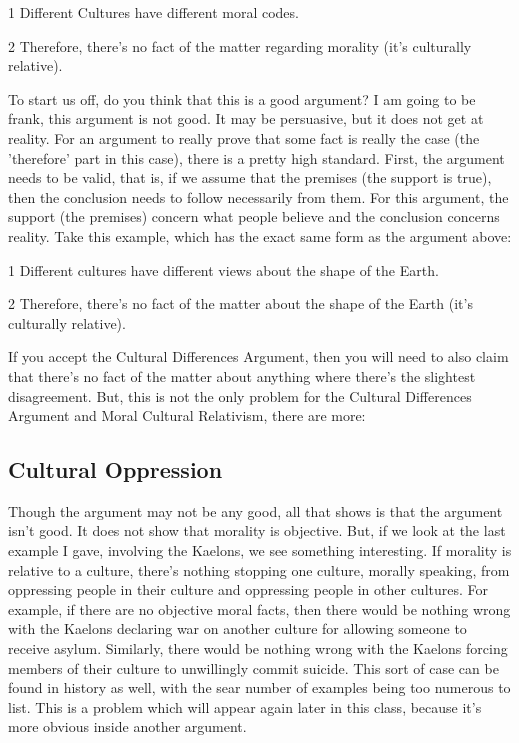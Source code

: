 \begin{earg}
\item[1] Different Cultures have different moral codes.
\item[2] Therefore, there's no fact of the matter regarding morality (it's culturally relative).
\end{earg}

To start us off, do you think that this is a good argument? I am going to be frank, this argument is not good. It may be persuasive, but it does not get at reality. For an argument to really prove that some fact is really the case (the 'therefore' part in this case), there is a pretty high standard. First, the argument needs to be valid, that is, if we assume that the premises (the support is true), then the conclusion needs to follow necessarily from them. For this argument, the support (the premises) concern what people believe and the conclusion concerns reality. Take this example, which has the exact same form as the argument above:
\begin{earg}
\item[1] Different cultures have different views about the shape of the Earth.
\item[2] Therefore, there's no fact of the matter about the shape of the Earth (it's culturally relative).
\end{earg}
If you accept the Cultural Differences Argument, then you will need to also claim that there's no fact of the matter about anything where there's the slightest disagreement. But, this is not the only problem for the Cultural Differences Argument and Moral Cultural Relativism, there are more:

\subsection{Cultural Oppression}

Though the argument may not be any good, all that shows is that the argument isn't good. It does not show that morality is objective. But, if we look at the last example I gave, involving the Kaelons, we see something interesting. If morality is relative to a culture, there's nothing stopping one culture, morally speaking, from oppressing people in their culture and oppressing people in other cultures. For example, if there are no objective moral facts, then there would be nothing wrong with the Kaelons declaring war on another culture for allowing someone to receive asylum. Similarly, there would be nothing wrong with the Kaelons forcing members of their culture to unwillingly commit suicide. This sort of case can be found in history as well, with the sear number of examples being too numerous to list. This is a problem which will appear again later in this class, because it's more obvious inside another argument.  

